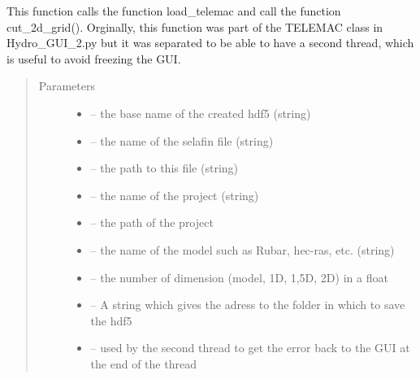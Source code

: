 \documentclass[letterpaper,10pt,english]{sphinxmanual}
\begin{document}
\begin{fulllineitems}
\label{\detokenize{index:src.selafin_habby1.load_telemac_and_cut_grid}}
This function calls the function load\_telemac and call the function cut\_2d\_grid(). Orginally, this function
was part of the TELEMAC class in Hydro\_GUI\_2.py but it was separated to be able to have a second thread, which
is useful to avoid freezing the GUI.
\begin{quote}\begin{description}
\item[{Parameters}] \leavevmode\begin{itemize}
\item {} 
 -- the base name of the created hdf5 (string)

\item {} 
 -- the name of the selafin file (string)

\item {} 
 -- the path to this file (string)

\item {} 
 -- the name of the project (string)

\item {} 
 -- the path of the project

\item {} 
 -- the name of the model such as Rubar, hec-ras, etc. (string)

\item {} 
 -- the number of dimension (model, 1D, 1,5D, 2D) in a float

\item {} 
 -- A string which gives the adress to the folder in which to save the hdf5

\item {} 
 -- used by the second thread to get the error back to the GUI at the end of the thread

\end{itemize}

\end{description}\end{quote}

\end{fulllineitems}
\end{document}
